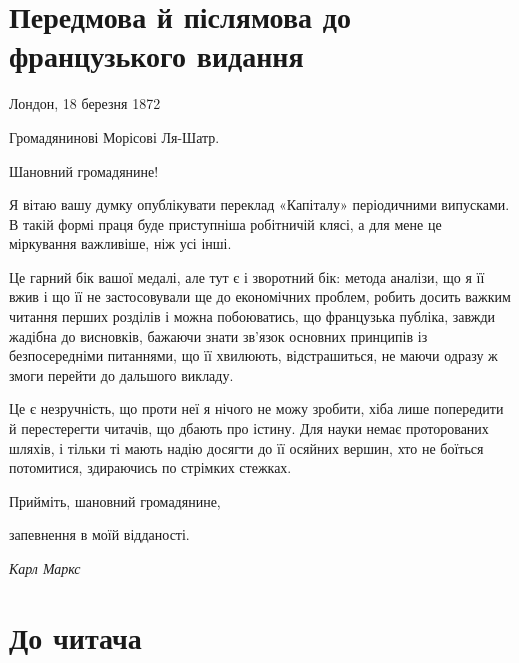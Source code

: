 \section*{Передмова й післямова до французького
видання}

\begin{flushright}
Лондон, 18 березня 1872
\end{flushright}

\begin{center}
Громадянинові Морісові Ля-Шатр.
\end{center}

\hspace{\parindent}\hspace{\parindent}
Шановний громадянине!

Я вітаю вашу думку опублікувати переклад «Капіталу» періодичними
випусками. В такій формі праця буде приступніша
робітничій клясі, а для мене це міркування важливіше, ніж
усі інші.

Це гарний бік вашої медалі, але тут є і зворотний бік: метода
аналізи, що я її вжив і що її не застосовували ще до економічних
проблем, робить досить важким читання перших розділів і можна
побоюватись, що французька публіка, завжди жадібна до висновків,
бажаючи знати зв’язок основних принципів із безпосередніми
питаннями, що її хвилюють, відстрашиться, не маючи одразу ж
змоги перейти до дальшого викладу.

Це є незручність, що проти неї я нічого не можу зробити, хіба
лише попередити й перестерегти читачів, що дбають про істину.
Для науки немає проторованих шляхів, і тільки ті мають надію
досягти до її осяйних вершин, хто не боїться потомитися, здираючись
по стрімких стежках.

\hspace{\parindent}\hspace{\parindent}
Прийміть, шановний громадянине,

\hspace{\parindent}\hspace{\parindent}
\hspace{\parindent}\hspace{\parindent}\hspace{\parindent}
запевнення в моїй відданості.

\begin{flushright}
\emph{Карл Маркс}
\end{flushright}

\section*{До читача}

